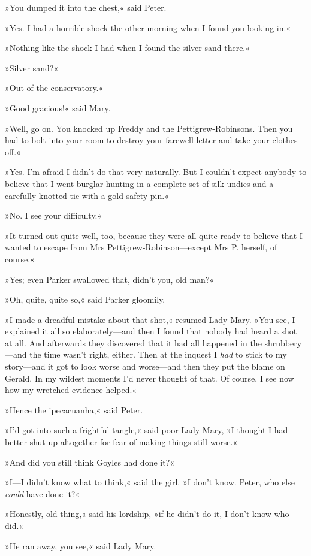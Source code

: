»You dumped it into the chest,« said Peter.

»Yes. I had a horrible shock the other morning when I found you looking in.«

»Nothing like the shock I had when I found the silver sand there.«

»Silver sand?«

»Out of the conservatory.«

»Good gracious!« said Mary.

»Well, go on. You knocked up Freddy and the Pettigrew-Robinsons. Then you had to bolt into your room to destroy your farewell letter and take your clothes off.«

»Yes. I'm afraid I didn't do that very naturally. But I couldn't expect anybody to believe that I went burglar-hunting in a complete set of silk undies and a carefully knotted tie with a gold safety-pin.«

»No. I see your difficulty.«

»It turned out quite well, too, because they were all quite ready to believe that I wanted to escape from Mrs Pettigrew-Robinson—except Mrs P. herself, of course.«

»Yes; even Parker swallowed that, didn't you, old man?«

»Oh, quite, quite so,« said Parker gloomily.

»I made a dreadful mistake about that shot,« resumed Lady Mary. »You see, I explained it all so elaborately—and then I found that nobody had heard a shot at all. And afterwards they discovered that it had all happened in the shrubbery—and the time wasn't right, either. Then at the inquest I \textit{had} to stick to my story—and it got to look worse and worse—and then they put the blame on Gerald. In my wildest moments I'd never thought of that. Of course, I see now how my wretched evidence helped.«

»Hence the ipecacuanha,« said Peter.

»I'd got into such a frightful tangle,« said poor Lady Mary, »I thought I had better shut up altogether for fear of making things still worse.«

»And did you still think Goyles had done it?«

»I—I didn't know what to think,« said the girl. »I don't know. Peter, who else \textit{could} have done it?«

»Honestly, old thing,« said his lordship, »if he didn't do it, I don't know who did.«

»He ran away, you see,« said Lady Mary.


